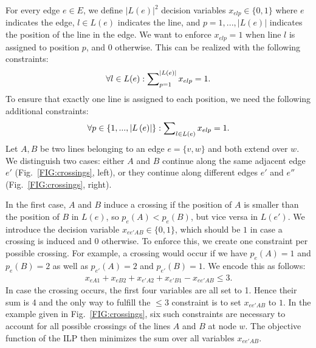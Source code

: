 \documentclass[sigconf]{acmart}
\begin{document}
For every edge $e \in E$, we define $\left|L\left(e\right)\right|^{2}$ decision variables $x_{elp} \in \{0,1\}$ where $e$ indicates the edge, $l \in L(e)$ indicates the line, and $p=1, ..., \left|L\left(e\right)\right|$ indicates the position of the line in the edge. We want to enforce $x_{elp}=1$ when line $l$ is assigned to position $p$, and $0$ otherwise. This can be realized with the following constraints:
\begin{equation}
\forall l \in L(e): \sum\nolimits_{p=1}^{|L(e)|} x_{elp}=1.  \label{EQ:p_constr1_bl}
\end{equation}
%
To ensure that exactly one line is assigned to each position, we need the following additional constraints:
%
\begin{equation}
	\forall p \in  \left\{1,...,\left|L\left(e\right)\right|\right\} : \sum\nolimits_{l \in L(e)} x_{elp} = 1. \label{EQ:p_constr2_bl}
\end{equation}%
Let $A, B$ be two lines belonging to an edge $e = \{v,w\}$ and both extend over $w$.
We distinguish two cases: either $A$ and $B$ continue along the same adjacent edge $e'$ (Fig.~\ref{FIG:crossings}, left), or they continue along different edges $e'$ and $e''$ (Fig.~\ref{FIG:crossings}, right).

In the first case, $A$ and $B$ induce a crossing if the position of $A$ is smaller than the position of $B$ in $L(e)$, so $p_e(A) < p_e(B)$, but vice versa in $L(e')$. We introduce the decision variable $x_{ee'AB} \in \{0,1\}$, which should be $1$ in case a crossing is induced and $0$ otherwise. To enforce this, we create one constraint per possible crossing. For example, a crossing would occur if we have $p_e(A)=1$ and $p_e(B)=2$ as well as $p_{e'}(A)=2$ and $p_{e'}(B) =1$. We encode this as follows:
\begin{align}
	x_{eA1} + x_{eB2} + x_{e'A2} + x_{e'B1} - x_{ee'AB} \leq 3  \label{EQ:crossdec_constr_bl}.
\end{align}
In case the crossing occurs, the first four variables are all set to 1. Hence their sum is 4 and the only way to fulfill the $\leq 3$ constraint is to set $x_{ee'AB}$ to $1$. In the example given in Fig.~\ref{FIG:crossings}, six such constraints are necessary to account for all possible crossings of the lines $A$ and $B$ at node $w$.
The objective function of the ILP then minimizes the sum over all variables $x_{ee'AB}$.
\end{document}
